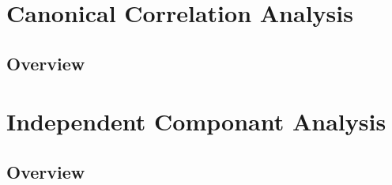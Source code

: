 \documentclass[11pt,fleqn]{book} %
\begin{document}


\chapter{Canonical Correlation Analysis}

\section{Overview}



\chapter{Independent Componant Analysis}

\section{Overview}





\cleardoublepage
{}
\setlength{\columnsep}{0.75cm}
\printindex

\end{document}
